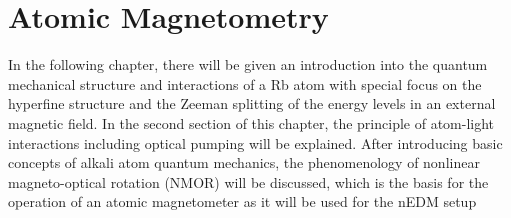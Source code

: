 \chapter{Atomic Magnetometry\label{ch:magnetometry}}


In the following chapter, there will be given an introduction into the quantum mechanical
structure and interactions of a Rb atom with special focus on the hyperfine structure and the Zeeman splitting of the energy levels in an external magnetic field. In the second section of this chapter, the principle of atom-light interactions including optical pumping
will be explained. After introducing basic concepts of alkali atom quantum mechanics, the phenomenology of nonlinear magneto-optical rotation (NMOR) will be discussed, which is the basis for the operation of an atomic magnetometer as it will be used for the nEDM setup

%
%  
%  
%  
%  
%  
%    
%  
% 
%
%
%      
%     
%       
%
%      
%
% 
%    
%    
%    
%    


